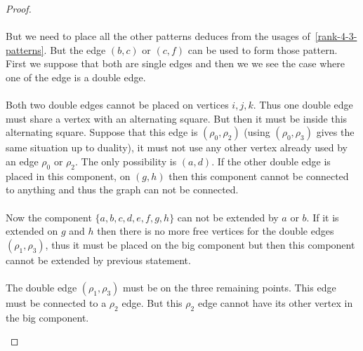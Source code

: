 \begin{proof}
\begin{figure}[H]
\begin{center}
\begin{tikzpicture}[scale=.8]
      \end{tikzpicture}
      \caption{}
    \end{center}
  \end{figure}

  \paragraph{}
  But we need to place all the other patterns deduces from the usages of~\ref{rank-4-3-patterns}. But the edge $(b,c)$ or $(c,f)$ can be used to form those pattern. First we suppose that both are single edges and then we we see the case where one of the edge is a double edge.

  \paragraph{}
  Both two double edges cannot be placed on vertices $i,j,k$. Thus one double edge must share a vertex with an alternating square. But then it must be inside this alternating square. Suppose that this edge is $(\rho_0, \rho_2)$ (using $(\rho_0, \rho_3)$ gives the same situation up to duality), it must not use any other vertex already used by an edge $\rho_0$ or $\rho_2$. The only possibility is $(a,d)$. If the other double edge is placed in this component, on $(g,h)$ then this component cannot be connected to anything and thus the graph can not be connected.

  \paragraph{}
  Now the component $\{a,b,c,d,e,f,g,h\}$ can not be extended by $a$ or $b$. If it is extended on $g$ and $h$ then there is no more free vertices for the double edges $(\rho_1, \rho_3)$, thus it must be placed on the big component but then this component cannot be extended by previous statement.

  \paragraph{}
  The double edge $(\rho_1, \rho_3)$ must be on the three remaining points. This edge must be connected to a $\rho_2$ edge. But this $\rho_2$ edge cannot have its other vertex in the big component.

  \begin{figure}[H]
    \begin{center}
      \begin{tikzpicture}[scale=.8]


\end{tikzpicture}
\end{center}
\end{figure}
\end{proof}
